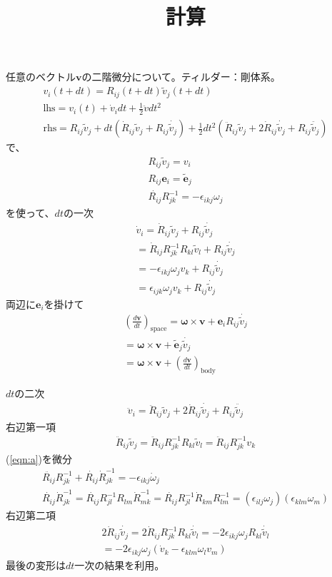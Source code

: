 \documentclass{jarticle}
\title{計算}
\begin{document}
任意のベクトル$\mathbf{v}$の二階微分について。ティルダー：剛体系。
\begin{eqnarray*}
v_i(t+dt) = R_{ij}(t+dt)\tilde{v}_j(t+dt) \\
\mbox{lhs} = v_i(t) + \dot{v}_i dt + \frac{1}{2} \ddot{v} dt^2 \\
\mbox{rhs} = R_{ij}\tilde{v}_j 
+ dt(\dot{R}_{ij}\tilde{v}_j + R_{ij}\dot{\tilde{v}_j})
+\frac{1}{2}dt^2(\ddot{R}_{ij}\tilde{v}_j + 2\dot{R}_{ij}\dot{\tilde{v}_j}+R_{ij}\ddot{\tilde{v}_j})
\end{eqnarray*}
で、
\begin{eqnarray}
R_{ij}\tilde{v}_j = v_i \\
R_{ij}\mathbf{e}_i = \tilde{\mathbf{e}}_j \\
\dot{R_{ij}}R^{-1}_{jk} = -\epsilon_{ikj} \omega_j \label{eqn:a}
\end{eqnarray}
を使って、$dt$の一次
\begin{eqnarray*}
\dot{v}_i = \dot{R}_{ij}\tilde{v}_j + R_{ij}\dot{\tilde{v}_j}\\
=\dot{R}_{ij}R^{-1}_{jk} R_{kl} \tilde{v}_l+ R_{ij}\dot{\tilde{v}_j}\\
=-\epsilon_{ikj}\omega_j v_k + R_{ij}\dot{\tilde{v}_j} \\
=\epsilon_{ijk}\omega_j v_k + R_{ij}\dot{\tilde{v}_j}
\end{eqnarray*}
両辺に$\mathbf{e}_i$を掛けて
\begin{eqnarray*}
\left(\frac{d\mathbf{v}}{dt}\right)_{\mbox{space}}=\mathbf{\omega}\times\mathbf{v} + \mathbf{e}_i R_{ij}\dot{\tilde{v}_j} \\
=\mathbf{\omega}\times\mathbf{v} + \tilde{\mathbf{e}}_j\dot{\tilde{v}_j}\\
=\mathbf{\omega}\times\mathbf{v} + \left(\frac{d\mathbf{v}}{dt}\right)_{\mbox{body}}
\end{eqnarray*}

$dt$の二次
\begin{eqnarray*}
\ddot{v}_i = \ddot{R}_{ij}\tilde{v}_j + 2\dot{R}_{ij}\dot{\tilde{v}_j}+R_{ij}\ddot{\tilde{v}_j}
\end{eqnarray*}
右辺第一項
\begin{eqnarray*}
\ddot{R}_{ij}\tilde{v}_j = \ddot{R}_{ij} R^{-1}_{jk} R_{kl}\tilde{v}_l =
\ddot{R}_{ij} R^{-1}_{jk} v_k
\end{eqnarray*}
(\ref{eqn:a})を微分
\begin{eqnarray*}
\ddot{R_{ij}}R^{-1}_{jk} + \dot{R_{ij}}\dot{R}^{-1}_{jk} = -\epsilon_{ikj} \dot{\omega}_j \\
\dot{R_{ij}}\dot{R}^{-1}_{jk} = \dot{R_{ij}}R^{-1}_{jl}R_{lm}\dot{R}^{-1}_{mk}
= \dot{R_{ij}}R^{-1}_{jl} \dot{R}_{km} R^{-1}_{lm}
= (\epsilon_{ilj}\omega_j)(\epsilon_{klm}\omega_m)
\end{eqnarray*}
右辺第二項
\begin{eqnarray*}
2\dot{R}_{ij}\dot{\tilde{v}_j}=2\dot{R}_{ij} R^{-1}_{jk} R_{kl} \dot{\tilde{v}_l} = -2\epsilon_{ikj}\omega_j R_{kl} \dot{\tilde{v}_l}\\
=-2\epsilon_{ikj}\omega_j (\dot{v}_k-\epsilon_{klm}\omega_l v_m)
\end{eqnarray*}
最後の変形は$dt$一次の結果を利用。
\end{document}

